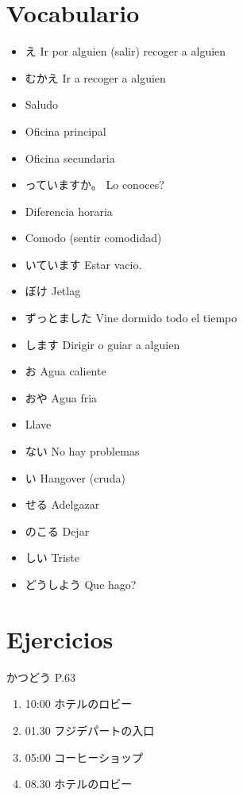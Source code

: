 \documentclass[a4paper,lualatex,ja=standard,base=10pt]{bxjsarticle}
\begin{document}
\section{Vocabulario}
\begin{itemize}
  \item {}え Ir por alguien (salir) recoger a alguien
  \item むかえ Ir a recoger a alguien
  \item {} Saludo
  \item {} Oficina principal
  \item {} Oficina secundaria
  \item {}っていますか。 Lo conoces?
  \item {} Diferencia horaria
  \item {} Comodo (sentir comodidad)
  \item {}いています Estar vacio.
  \item {}ぼけ Jetlag
  \item ずっとました Vine dormido todo el tiempo
  \item {}します Dirigir o guiar a alguien
  \item お Agua caliente
  \item おや Agua fria
  \item {} Llave
  \item {}ない No hay problemas
  \item {}い Hangover (cruda)
  \item {}せる Adelgazar
  \item のこる Dejar
  \item {}しい Triste
  \item どうしよう Que hago?
\end{itemize}


\section{Ejercicios}

かつどう P.63

\begin{enumerate}
  \item 10:00 ホテルのロビー
  \item 01.30 フジデパートの入口
  \item 05:00 コーヒーショップ
  \item 08.30 ホテルのロビー
\end{enumerate}
\end{document}
